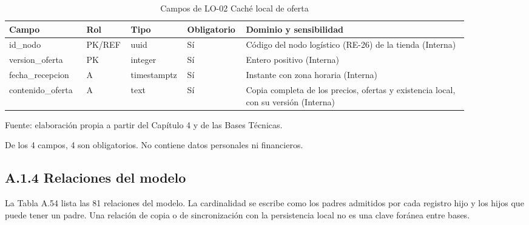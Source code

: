 \documentclass[11pt]{article}
\begin{document}
\begin{table}[htbp]
\caption{Campos de LO-02 Caché local de oferta}\label{tab:d_lo02}
\centering
\begin{tabular}{@{}p{0.167\linewidth}p{0.070\linewidth}p{0.079\linewidth}p{0.097\linewidth}p{0.465\linewidth}@{}}
\toprule Campo & Rol & Tipo & Obligatorio & Dominio y sensibilidad \\
\midrule
id\_nodo & PK/REF & uuid & Sí & Código del nodo logístico (RE-26) de la tienda (Interna) \\
version\_oferta & PK & integer & Sí & Entero positivo (Interna) \\
fecha\_recepcion & A & timestamptz & Sí & Instante con zona horaria (Interna) \\
contenido\_oferta & A & text & Sí & Copia completa de los precios, ofertas y existencia local, con su versión (Interna) \\
\bottomrule
\end{tabular}
\par\smallskip
{\raggedright Fuente: elaboración propia a partir del Capítulo 4 y de las Bases Técnicas.\par}
\end{table}


De los 4 campos, 4 son obligatorios. No contiene datos personales ni financieros.

\subsection{A.1.4 Relaciones del modelo}

La Tabla A.54 lista las 81 relaciones del modelo. La cardinalidad se escribe como los padres admitidos por cada registro hijo y los hijos que puede tener un padre. Una relación de copia o de sincronización con la persistencia local no es una clave foránea entre bases.
\end{document}
